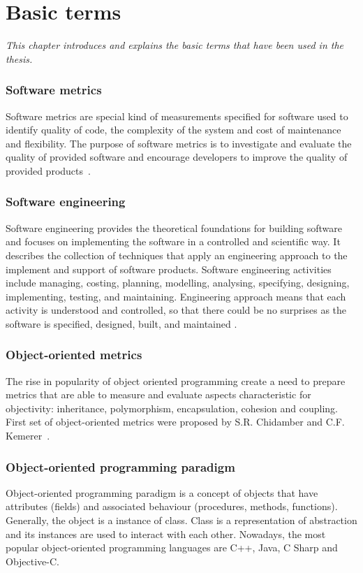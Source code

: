 \chapter{Basic terms} \label{roz:basic_terms}

\textit{This chapter introduces and explains the basic terms that have been used in the thesis.}

\subsection*{Software metrics}
Software metrics are special kind of measurements specified for software used to identify quality of code, the complexity of the system and cost of maintenance and flexibility. The purpose of software metrics is to investigate and evaluate the quality of provided software and encourage developers to improve the quality of provided products~\cite{metrics}.

\subsection*{Software engineering}
Software engineering provides the theoretical foundations for building software and focuses on implementing the software in a controlled and scientific way.  It describes the collection of techniques that apply an engineering approach to the implement and support of software products. Software engineering activities include managing, costing, planning, modelling, analysing, specifying,  designing, implementing, testing, and maintaining. Engineering approach means that each activity is understood and controlled, so that there could be no surprises as the software is specified, designed, built, and maintained \cite{rigorous}.

\subsection*{Object-oriented metrics}
The rise in popularity of object oriented programming create a need to prepare metrics that are able to measure and evaluate aspects characteristic for objectivity: inheritance, polymorphism, encapsulation, cohesion and coupling. First set of object-oriented metrics were proposed by S.R. Chidamber and C.F. Kemerer~\cite{alain}.

\subsection*{Object-oriented programming paradigm}
Object-oriented programming paradigm is a concept of objects that have attributes (fields) and associated behaviour (procedures, methods, functions). Generally, the object is a instance of class. Class is a representation of abstraction and its instances are used to interact with each other. Nowadays, the most popular object-oriented programming languages are C++, Java, C Sharp  and Objective-C.  

